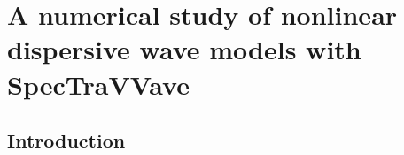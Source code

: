 \section{A numerical study of nonlinear dispersive wave models with SpecTraVVave}

%
%


\subsection{Introduction}
\label{intro}

